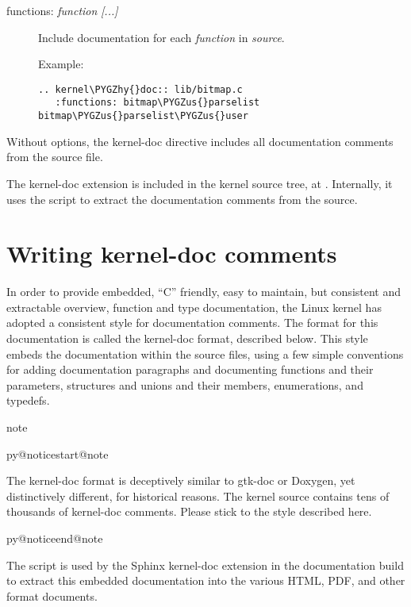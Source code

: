 \documentclass[a4paper,8pt,english]{sphinxmanual}
\makeatletter
\renewenvironment{notice}[2]{%
          \def\py@noticetype{#1}
          \begin{coloredbox}{#1}
          \bf\it
          \par\strong{#2}
          \csname py@noticestart@#1\endcsname
        }
	{
          \csname py@noticeend@\py@noticetype\endcsname
          \end{coloredbox}
        }
\def\PYGZus{\char`\_}
\def\PYGZhy{\char`\-}
\makeatother
\begin{document}
\begin{description}
\item[{functions: \emph{function} \emph{{[}...{]}}}] \leavevmode
Include documentation for each \emph{function} in \emph{source}.

Example:

\begin{Verbatim}[commandchars=\\\{\}]
.. kernel\PYGZhy{}doc:: lib/bitmap.c
   :functions: bitmap\PYGZus{}parselist bitmap\PYGZus{}parselist\PYGZus{}user
\end{Verbatim}

\end{description}

Without options, the kernel-doc directive includes all documentation comments
from the source file.

The kernel-doc extension is included in the kernel source tree, at
. Internally, it uses the
 script to extract the documentation comments from the
source.


\chapter{Writing kernel-doc comments}
\label{doc-guide/kernel-doc:kernel-doc}\label{doc-guide/kernel-doc:writing-kernel-doc-comments}
In order to provide embedded, ``C'' friendly, easy to maintain, but consistent and
extractable overview, function and type documentation, the Linux kernel has
adopted a consistent style for documentation comments. The format for this
documentation is called the kernel-doc format, described below. This style
embeds the documentation within the source files, using a few simple conventions
for adding documentation paragraphs and documenting functions and their
parameters, structures and unions and their members, enumerations, and typedefs.

\begin{notice}{note}{Note:}
The kernel-doc format is deceptively similar to gtk-doc or Doxygen,
yet distinctively different, for historical reasons. The kernel source
contains tens of thousands of kernel-doc comments. Please stick to the style
described here.
\end{notice}

The  script is used by the Sphinx kernel-doc extension in
the documentation build to extract this embedded documentation into the various
HTML, PDF, and other format documents.
\end{document}
